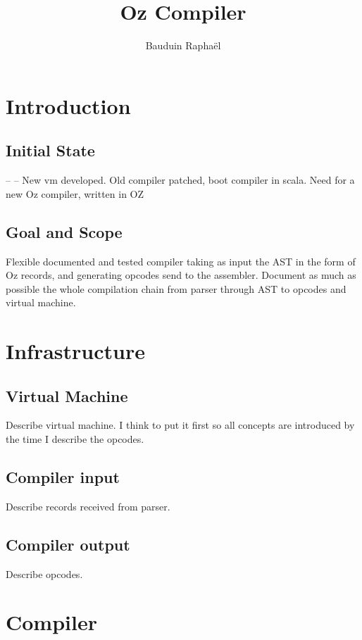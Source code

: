 \documentclass[draft,a4paper]{memoir}
\author{Bauduin Raphaël}
\title{Oz Compiler}
\begin{document}
\ifdraftdoc
{}
\fi

\immediate{} 

\maketitle
\tableofcontents


\chapter{Introduction}
\section{Initial State}
\GITAbrHash
--
\VCModifiedText
--
New vm developed.
Old compiler patched, boot compiler in scala.
Need for a new Oz compiler, written in OZ

\section{Goal and Scope}
Flexible documented and tested compiler taking as input the AST in the form of Oz records, and generating opcodes send to the assembler.
Document as much as possible the whole compilation chain from parser through AST to opcodes and virtual machine.

\chapter{Infrastructure}
\section{Virtual Machine}
Describe virtual machine. I think to put it first so all concepts are introduced by the time I describe the opcodes.
\section{Compiler input}
Describe records received from parser.
\section{Compiler output}
Describe opcodes.


\chapter{Compiler}
\end{document}

